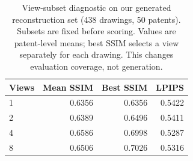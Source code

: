 \begin{table}[t]
\centering\small
\caption{View-subset diagnostic on our generated reconstruction set (438 drawings, 50 patents). Subsets are fixed before scoring. Values are patent-level means; best SSIM selects a view separately for each drawing. This changes evaluation coverage, not generation.}
\label{tab:view_subsets}
\begin{tabular*}{\columnwidth}{@{\extracolsep{\fill}}lrrr@{}}
\toprule
Views & Mean SSIM & Best SSIM & LPIPS \\
\midrule
1 & 0.6356 & 0.6356 & 0.5422 \\
2 & 0.6389 & 0.6496 & 0.5411 \\
4 & 0.6586 & 0.6998 & 0.5287 \\
8 & 0.6506 & 0.7026 & 0.5316 \\
\bottomrule
\end{tabular*}
\end{table}
